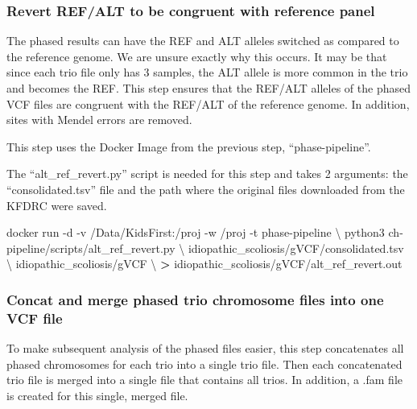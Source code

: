 \documentclass[]{article}
\newenvironment{Shaded}{\begin{snugshade}}{\end{snugshade}}
\newcommand{\ExtensionTok}[1]{#1}
\newcommand{\NormalTok}[1]{#1}
\newcommand{\OperatorTok}[1]{\textcolor[rgb]{0.81,0.36,0.00}{\textbf{#1}}}
\begin{document}
\hypertarget{revert-refalt-to-be-congruent-with-reference-panel}{%
\subsubsection{Revert REF/ALT to be congruent with reference
panel}\label{revert-refalt-to-be-congruent-with-reference-panel}}

The phased results can have the REF and ALT alleles switched as compared
to the reference genome. We are unsure exactly why this occurs. It may
be that since each trio file only has 3 samples, the ALT allele is more
common in the trio and becomes the REF. This step ensures that the
REF/ALT alleles of the phased VCF files are congruent with the REF/ALT
of the reference genome. In addition, sites with Mendel errors are
removed.

This step uses the Docker Image from the previous step,
``phase-pipeline''.

The ``alt\_ref\_revert.py'' script is needed for this step and takes 2
arguments: the ``consolidated.tsv'' file and the path where the original
files downloaded from the KFDRC were saved.

\begin{Shaded}
\begin{Highlighting}[]
\ExtensionTok{docker}\NormalTok{ run -d -v /Data/KidsFirst:/proj -w /proj -t phase-pipeline \textbackslash{}}
\NormalTok{  python3 ch-pipeline/scripts/alt_ref_revert.py \textbackslash{}}
\NormalTok{  idiopathic_scoliosis/gVCF/consolidated.tsv \textbackslash{}}
\NormalTok{  idiopathic_scoliosis/gVCF \textbackslash{}}
  \OperatorTok{>}\NormalTok{ idiopathic_scoliosis/gVCF/alt_ref_revert.out}
\end{Highlighting}
\end{Shaded}

\hypertarget{concat-and-merge-phased-trio-chromosome-files-into-one-vcf-file}{%
\subsubsection{Concat and merge phased trio chromosome files into one
VCF
file}\label{concat-and-merge-phased-trio-chromosome-files-into-one-vcf-file}}

To make subsequent analysis of the phased files easier, this step
concatenates all phased chromosomes for each trio into a single trio
file. Then each concatenated trio file is merged into a single file that
contains all trios. In addition, a .fam file is created for this single,
merged file.
\end{document}
